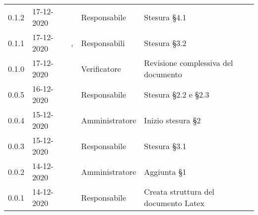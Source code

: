 {{\begin{longtable}{C{1.7cm} C{2.5cm} C{3.2cm} C{2.7cm} C{4.8cm}}
0.1.2 & 17-12-2020 & \SG{} & Responsabile & Stesura \S 4.1 \\

0.1.1 & 17-12-2020 & \SG{},\newline \BM{} & Responsabili & Stesura \S 3.2 \\

0.1.0 & 17-12-2020 & \ZM{} & Verificatore & Revisione complessiva del documento \\

0.0.5 & 16-12-2020 & \BM{} & Responsabile & Stesura \S 2.2 e \S 2.3 \\
		
0.0.4 & 15-12-2020 & \PA{} & Amministratore & Inizio stesura \S 2 \\

0.0.3 & 15-12-2020 & \SG{} & Responsabile & Stesura \S 3.1 \\

0.0.2 & 14-12-2020 & \PA{} & Amministratore & Aggiunta \S 1 \\

0.0.1 & 14-12-2020 & \SG{} & Responsabile & Creata struttura del documento Latex \\
		
\end{longtable}
}
}
